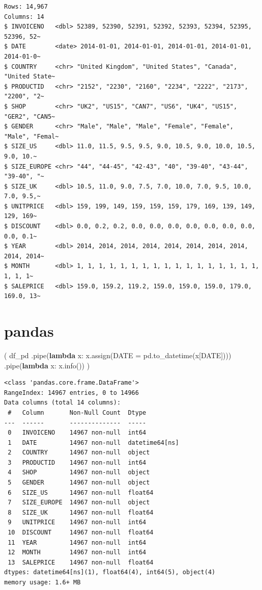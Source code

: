 \documentclass[
  letterpaper,
  DIV=11,
  numbers=noendperiod]{scrreprt}
\newenvironment{Shaded}{\begin{snugshade}}{\end{snugshade}}
\newcommand{\KeywordTok}[1]{\textcolor[rgb]{0.00,0.23,0.31}{\textbf{#1}}}
\newcommand{\NormalTok}[1]{\textcolor[rgb]{0.00,0.23,0.31}{#1}}
\newcommand{\OperatorTok}[1]{\textcolor[rgb]{0.37,0.37,0.37}{#1}}
\newcommand{\StringTok}[1]{\textcolor[rgb]{0.13,0.47,0.30}{#1}}
\begin{document}
\begin{verbatim}
Rows: 14,967
Columns: 14
$ INVOICENO   <dbl> 52389, 52390, 52391, 52392, 52393, 52394, 52395, 52396, 52~
$ DATE        <date> 2014-01-01, 2014-01-01, 2014-01-01, 2014-01-01, 2014-01-0~
$ COUNTRY     <chr> "United Kingdom", "United States", "Canada", "United State~
$ PRODUCTID   <chr> "2152", "2230", "2160", "2234", "2222", "2173", "2200", "2~
$ SHOP        <chr> "UK2", "US15", "CAN7", "US6", "UK4", "US15", "GER2", "CAN5~
$ GENDER      <chr> "Male", "Male", "Male", "Female", "Female", "Male", "Femal~
$ SIZE_US     <dbl> 11.0, 11.5, 9.5, 9.5, 9.0, 10.5, 9.0, 10.0, 10.5, 9.0, 10.~
$ SIZE_EUROPE <chr> "44", "44-45", "42-43", "40", "39-40", "43-44", "39-40", "~
$ SIZE_UK     <dbl> 10.5, 11.0, 9.0, 7.5, 7.0, 10.0, 7.0, 9.5, 10.0, 7.0, 9.5,~
$ UNITPRICE   <dbl> 159, 199, 149, 159, 159, 159, 179, 169, 139, 149, 129, 169~
$ DISCOUNT    <dbl> 0.0, 0.2, 0.2, 0.0, 0.0, 0.0, 0.0, 0.0, 0.0, 0.0, 0.0, 0.1~
$ YEAR        <dbl> 2014, 2014, 2014, 2014, 2014, 2014, 2014, 2014, 2014, 2014~
$ MONTH       <dbl> 1, 1, 1, 1, 1, 1, 1, 1, 1, 1, 1, 1, 1, 1, 1, 1, 1, 1, 1, 1~
$ SALEPRICE   <dbl> 159.0, 159.2, 119.2, 159.0, 159.0, 159.0, 179.0, 169.0, 13~
\end{verbatim}

\section{pandas}

\begin{Shaded}
\begin{Highlighting}[]
\NormalTok{(}
\NormalTok{    df\_pd}
\NormalTok{    .pipe(}\KeywordTok{lambda}\NormalTok{ x: x.assign(DATE }\OperatorTok{=}\NormalTok{ pd.to\_datetime(x[}\StringTok{\textquotesingle{}DATE\textquotesingle{}}\NormalTok{])))}
\NormalTok{    .pipe(}\KeywordTok{lambda}\NormalTok{ x: x.info())}
\NormalTok{)}
\end{Highlighting}
\end{Shaded}

\begin{verbatim}
<class 'pandas.core.frame.DataFrame'>
RangeIndex: 14967 entries, 0 to 14966
Data columns (total 14 columns):
 #   Column       Non-Null Count  Dtype         
---  ------       --------------  -----         
 0   INVOICENO    14967 non-null  int64         
 1   DATE         14967 non-null  datetime64[ns]
 2   COUNTRY      14967 non-null  object        
 3   PRODUCTID    14967 non-null  int64         
 4   SHOP         14967 non-null  object        
 5   GENDER       14967 non-null  object        
 6   SIZE_US      14967 non-null  float64       
 7   SIZE_EUROPE  14967 non-null  object        
 8   SIZE_UK      14967 non-null  float64       
 9   UNITPRICE    14967 non-null  int64         
 10  DISCOUNT     14967 non-null  float64       
 11  YEAR         14967 non-null  int64         
 12  MONTH        14967 non-null  int64         
 13  SALEPRICE    14967 non-null  float64       
dtypes: datetime64[ns](1), float64(4), int64(5), object(4)
memory usage: 1.6+ MB
\end{verbatim}
\end{document}
